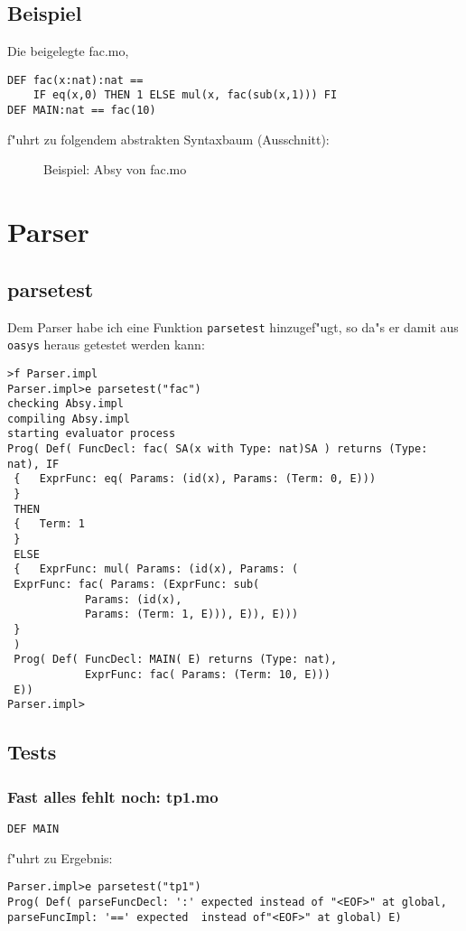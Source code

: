 \documentclass[a4paper,12pt]{report}
\begin{document}
\section{Beispiel}
Die beigelegte fac.mo,
\begin{verbatim}
DEF fac(x:nat):nat ==
    IF eq(x,0) THEN 1 ELSE mul(x, fac(sub(x,1))) FI
DEF MAIN:nat == fac(10)
\end{verbatim}
f"uhrt zu folgendem abstrakten Syntaxbaum (Ausschnitt):
\begin{figure}[h]
\caption{Beispiel: Absy von fac.mo}
\end{figure}

\chapter{Parser}
\section{parsetest}
Dem Parser habe ich eine Funktion \texttt{parsetest} hinzugef"ugt, so da"s er damit aus \texttt{oasys} heraus getestet werden kann:
\begin{verbatim}
>f Parser.impl
Parser.impl>e parsetest("fac")
checking Absy.impl
compiling Absy.impl
starting evaluator process
Prog( Def( FuncDecl: fac( SA(x with Type: nat)SA ) returns (Type: nat), IF
 {   ExprFunc: eq( Params: (id(x), Params: (Term: 0, E)))
 }
 THEN
 {   Term: 1
 }
 ELSE
 {   ExprFunc: mul( Params: (id(x), Params: (
 ExprFunc: fac( Params: (ExprFunc: sub( 
            Params: (id(x), 
            Params: (Term: 1, E))), E)), E)))
 }
 )
 Prog( Def( FuncDecl: MAIN( E) returns (Type: nat), 
            ExprFunc: fac( Params: (Term: 10, E)))
 E))
Parser.impl> 
\end{verbatim}

\section{Tests}
\subsection{Fast alles fehlt noch: tp1.mo}
\begin{verbatim}
DEF MAIN
\end{verbatim}
f"uhrt zu Ergebnis:
\begin{verbatim}
Parser.impl>e parsetest("tp1")
Prog( Def( parseFuncDecl: ':' expected instead of "<EOF>" at global, 
parseFuncImpl: '==' expected  instead of"<EOF>" at global) E)
\end{verbatim}
\end{document}
